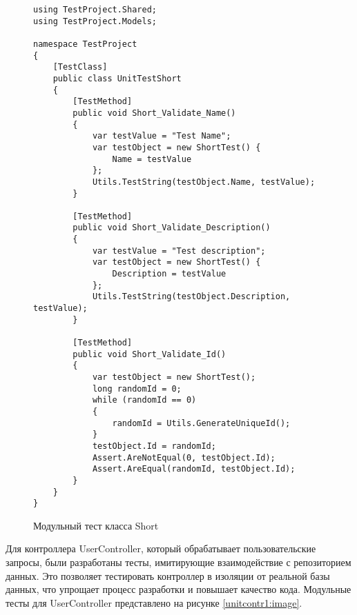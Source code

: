 \begin{figure}[ht]
\lstset{style=sharpc}
\begin{lstlisting}
using TestProject.Shared;
using TestProject.Models;

namespace TestProject
{
    [TestClass]
    public class UnitTestShort
    {
        [TestMethod]
        public void Short_Validate_Name()
        {
            var testValue = "Test Name";
            var testObject = new ShortTest() {
                Name = testValue
            };
            Utils.TestString(testObject.Name, testValue);
        }

        [TestMethod]
        public void Short_Validate_Description()
        {
            var testValue = "Test description";
            var testObject = new ShortTest() {
                Description = testValue
            };
            Utils.TestString(testObject.Description, testValue);
        }

        [TestMethod]
        public void Short_Validate_Id()
        {
            var testObject = new ShortTest();
            long randomId = 0;
            while (randomId == 0)
            {
                randomId = Utils.GenerateUniqueId();
            }
            testObject.Id = randomId;
            Assert.AreNotEqual(0, testObject.Id);
            Assert.AreEqual(randomId, testObject.Id);
        }
    }
}  
\end{lstlisting}
\caption{Модульный тест класса Short}
\label{unitshort1:image}
\end{figure}

Для контроллера UserController, который обрабатывает пользовательские запросы, были разработаны тесты, имитирующие взаимодействие с репозиторием данных. Это позволяет тестировать контроллер в изоляции от реальной базы данных, что упрощает процесс разработки и повышает качество кода.
Модульные тесты для UserController представлено на рисунке \ref{unitcontr1:image}.

